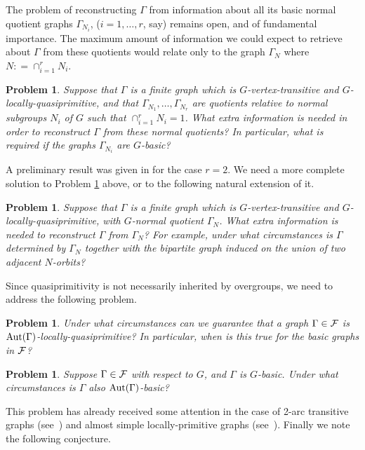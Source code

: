 \documentclass[12pt, a4paper]{article}
\newtheorem{problem}[theorem]{Problem}
\def\Ga{\Gamma}
\def\Aut{{\rm Aut}}
\begin{document}
The problem of reconstructing $\Gamma$
from information about all its basic normal quotient graphs $\Gamma_{N_i}$,
($i=1,\ldots,r$, say) remains open, and of fundamental importance. The
maximum amount of information we could expect to retrieve about $\Gamma$
from these quotients would relate only to the graph $\Gamma_N$ where
$N: = \cap_{i=1}^r N_i$.

\begin{problem}\label{prob:rec}
Suppose that $\Gamma$ is a finite graph which is $G$-vertex-transitive
and $G$-locally-quasiprimitive, and that
$\Gamma_{N_1},\ldots,\Gamma_{N_r}$ are
 quotients relative to normal subgroups $N_i$ of $G$ such that
$\cap_{i=1}^r N_i = 1$. What extra information is needed in order to
reconstruct $\Ga$ from these  normal quotients? In particular, what is
required  if the graphs $\Ga_{N_i}$ are $G$-basic?
\end{problem}

A preliminary result was given in \cite{lpvz} for
the case $r=2$. 
We need a more complete solution to Problem \ref{prob:rec} above, 
or to the following natural extension of it.

\begin{problem}
Suppose that $\Gamma$ is a finite graph which is $G$-vertex-transitive
and $G$-local\-ly-quasiprim\-it\-ive, with $G$-normal quotient $\Gamma_N$. What
extra
information is needed to reconstruct $\Gamma$ from $\Gamma_N$? For
example, under what circumstances is $\Gamma$ determined by $\Gamma_N$
together with the bipartite graph induced on the union of two adjacent
$N$-orbits?
\end{problem}

Since quasiprimitivity is not necessarily inherited by
overgroups, we need to address the following problem.

\begin{problem}
Under what circumstances can we guarantee that a graph $\Ga \in {\cal F}$ 
is $\mbox{\rm Aut}(\Ga)$-locally-quasiprimitive?
In particular, when is this true for the
basic graphs in ${\cal F}$?
\end{problem}

\begin{problem}
Suppose $\Ga \in {\cal F}$ with respect to $G$, and $\Ga$ is $G$-basic.
Under what circumstances is $\Ga$ also $\Aut(\Ga)$-basic? 
\end{problem}

This problem has already received some attention in the case of 2-arc
transitive graphs (see~\cite{li}) and almost simple locally-primitive graphs
(see~\cite{fp, fhp}). Finally we note the following conjecture.
\end{document}
